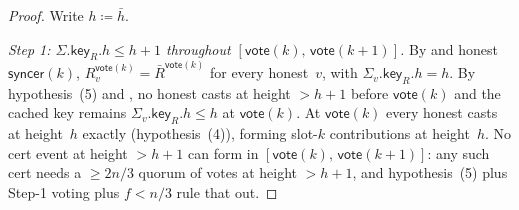 \documentclass{article}
\newcommand{\key}{\mathsf{key}}
\newcommand{\syncer}{\mathsf{syncer}}
\newcommand{\vote}{\mathsf{vote}}
\newcommand{\comm}[1]{\bar{#1}}
\theoremstyle{plain}
\theoremstyle{definition}
\theoremstyle{remark}
\begin{document}
\begin{proof}
Write $h \coloneqq \comm{h}$.

\emph{Step 1: $\Sigma.\key_R.h \leq h+1$ throughout $[\vote(k),\, \vote(k+1)]$.}
By  and honest $\syncer(k)$, $R_v^{\vote(k)} = \comm{R}^{\vote(k)}$ for every honest~$v$, with $\Sigma_v.\key_R.h = h$. By hypothesis~(5) and , no honest casts at height $> h+1$ before $\vote(k)$ and the cached key remains $\Sigma_v.\key_R.h \leq h$ at $\vote(k)$. At $\vote(k)$ every honest casts at height~$h$ exactly (hypothesis~(4)), forming slot-$k$ contributions at height~$h$. No cert event at height $> h+1$ can form in $[\vote(k),\, \vote(k+1)]$: any such cert needs a $\geq 2n/3$ quorum of votes at height $> h+1$, and hypothesis~(5) plus Step-1 voting plus $f < n/3$ rule that out.


\end{proof}
\end{document}
